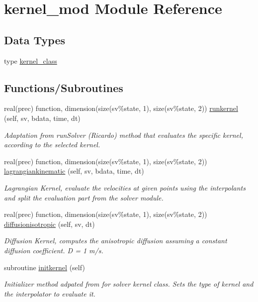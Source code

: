 \hypertarget{namespacekernel__mod}{}\section{kernel\+\_\+mod Module Reference}
\label{namespacekernel__mod}
\subsection*{Data Types}
\begin{DoxyCompactItemize}
\item 
type \mbox{\hyperlink{structkernel__mod_1_1kernel__class}{kernel\+\_\+class}}
\end{DoxyCompactItemize}
\subsection*{Functions/\+Subroutines}
\begin{DoxyCompactItemize}
\item 
real(prec) function, dimension(size(sv\%state, 1), size(sv\%state, 2)) \mbox{\hyperlink{namespacekernel__mod_ae17673ed6d32a4e7f6e54276e6430cc9}{runkernel}} (self, sv, bdata, time, dt)
\begin{DoxyCompactList}\small\item\em Adaptation from run\+Solver (Ricardo) method that evaluates the specific kernel, according to the selected kernel. \end{DoxyCompactList}\item 
real(prec) function, dimension(size(sv\%state, 1), size(sv\%state, 2)) \mbox{\hyperlink{namespacekernel__mod_aec47ab247a9afc2a7fdc272620b3c5e8}{lagrangiankinematic}} (self, sv, bdata, time, dt)
\begin{DoxyCompactList}\small\item\em Lagrangian Kernel, evaluate the velocities at given points using the interpolants and split the evaluation part from the solver module. \end{DoxyCompactList}\item 
real(prec) function, dimension(size(sv\%state, 1), size(sv\%state, 2)) \mbox{\hyperlink{namespacekernel__mod_a92805ef71e30527b27de4efd7561f8f7}{diffusionisotropic}} (self, sv, dt)
\begin{DoxyCompactList}\small\item\em Diffusion Kernel, computes the anisotropic diffusion assuming a constant diffusion coefficient. D = 1 m/s. \end{DoxyCompactList}\item 
subroutine \mbox{\hyperlink{namespacekernel__mod_a26c62a8eec723402e20142e68ba7ec65}{initkernel}} (self)
\begin{DoxyCompactList}\small\item\em Initializer method adpated from for solver kernel class. Sets the type of kernel and the interpolator to evaluate it. \end{DoxyCompactList}\end{DoxyCompactItemize}


